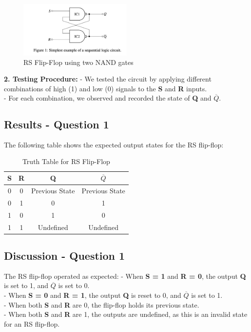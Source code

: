\documentclass{article}
\begin{document}
    \begin{figure}[H]
        \centering
        \includegraphics[width=0.5\textwidth]{./img/Lab 11/11_1_1.png} 
        \caption{RS Flip-Flop using two NAND gates}
        \label{fig:RS_FlipFlop}
    \end{figure}

    \textbf{2. Testing Procedure:}
    - We tested the circuit by applying different combinations of high (1) and low (0) signals to the \textbf{S} and \textbf{R} inputs.
    \\
    - For each combination, we observed and recorded the state of \textbf{Q} and \textbf{\(\overline{Q}\)}.
    \\

    \subsection*{\textbf{Results - Question 1}}
    The following table shows the expected output states for the RS flip-flop: \\

    \begin{table}[H]
        \centering
        \caption{Truth Table for RS Flip-Flop}
        \begin{tabular}{|c|c|c|c|}
            \hline
            S & R & Q & \(\overline{Q}\) \\
            \hline
            0 & 0 & Previous State & Previous State \\
            0 & 1 & 0 & 1 \\
            1 & 0 & 1 & 0 \\
            1 & 1 & Undefined & Undefined \\
            \hline
        \end{tabular}
    \end{table}

    \subsection*{\textbf{Discussion - Question 1}}
    The RS flip-flop operated as expected:
    - When \textbf{S = 1} and \textbf{R = 0}, the output \textbf{Q} is set to 1, and \textbf{\(\overline{Q}\)} is set to 0.
    \\
    - When \textbf{S = 0} and \textbf{R = 1}, the output \textbf{Q} is reset to 0, and \textbf{\(\overline{Q}\)} is set to 1.
    \\
    - When both \textbf{S} and \textbf{R} are 0, the flip-flop holds its previous state.
    \\
    - When both \textbf{S} and \textbf{R} are 1, the outputs are undefined, as this is an invalid state for an RS flip-flop.
    \\
\end{document}
